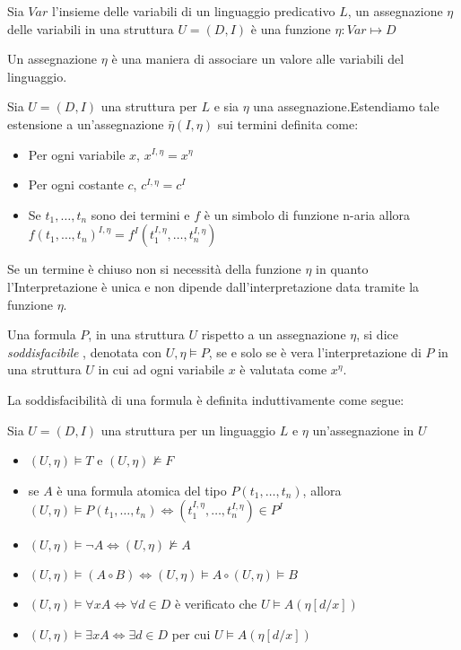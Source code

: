 \begin{defi}
    Sia $Var$ l'insieme delle variabili di un linguaggio predicativo $L$, un assegnazione $\eta$
    delle variabili in una struttura $U = (D,I)$ è una funzione $\eta:Var \mapsto D$
\end{defi}
Un assegnazione $\eta$ è una maniera di associare un valore alle variabili del linguaggio.

\begin{defi}
    Sia $U =(D,I)$ una struttura per $L$ e sia $\eta$ una assegnazione.Estendiamo
    tale estensione a un'assegnazione $\bar{\eta}(I,\eta)$ sui termini definita come:
    \begin{itemize}
        \item Per ogni variabile $x$, $x^{I,\eta} = x^{\eta}$
        \item Per ogni costante $c$, $c ^{I,\eta} = c^I$
        \item Se $t_1,\dots,t_n$ sono dei termini e $f$ è un simbolo di funzione n-aria
              allora $f(t_1,\dots,t_n)^{I,\eta} = f^I(t_1 ^{I,\eta},\dots,t_n ^{I,\eta})$
    \end{itemize}
\end{defi}

Se un termine è chiuso non si necessità della funzione $\eta$ in quanto l'Interpretazione
è unica e non dipende dall'interpretazione data tramite la funzione $\eta$.

Una formula $P$, in una struttura $U$ rispetto a un assegnazione $\eta$, si dice \emph{soddisfacibile}
, denotata con $U,\eta \models P$, se e solo se è vera l'interpretazione di $P$
in una struttura $U$ in cui ad ogni variabile $x$ è valutata come $x^{\eta}$.

La soddisfacibilità di una formula è definita induttivamente come segue:
\begin{defi}
    Sia $U = (D,I)$ una struttura per un linguaggio $L$ e $\eta$ un'assegnazione in $U$
    \begin{itemize}
        \item $(U,\eta) \models T$ e $(U,\eta) \not \models F$
        \item se $A$ è una formula atomica del tipo $P(t_1,\dots,t_n)$, allora
              $(U,\eta) \models P(t_1,\dots,t_n) \iff (t_1^{I,\eta},\dots,t_n^{I,\eta}) \in P^I$
        \item $(U,\eta) \models \neg A \iff (U,\eta) \not \models A$
        \item $(U,\eta) \models (A \circ B) \iff (U,\eta) \models A \circ (U,\eta) \models B$
        \item $(U,\eta) \models \forall x A \iff \forall d \in D$ è verificato che $U \models A(\eta[d/x])$
        \item $(U,\eta) \models \exists x A \iff \exists d \in D$ per cui $U \models A(\eta[d/x])$
    \end{itemize}
\end{defi}

